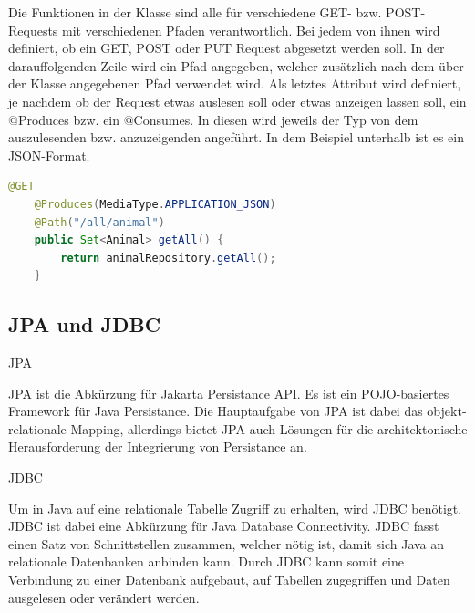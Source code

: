 Die Funktionen in der Klasse sind alle für verschiedene GET- bzw. POST-Requests mit verschiedenen Pfaden verantwortlich. Bei jedem von ihnen wird definiert, ob ein GET, POST oder PUT Request abgesetzt werden soll. In der darauffolgenden Zeile wird ein Pfad angegeben, welcher zusätzlich nach dem über der Klasse angegebenen Pfad verwendet wird. Als letztes Attribut wird definiert, je nachdem ob der Request etwas auslesen soll oder etwas anzeigen lassen soll, ein @Produces bzw. ein @Consumes. In diesen wird jeweils der Typ von dem auszulesenden bzw. anzuzeigenden angeführt. In dem Beispiel unterhalb ist es ein JSON-Format. \cite{quarkusRest}
\begin{lstlisting}[language=java,caption=Quarkus POST-Request,label=lst:impl:canvasJSchartOptions]
    @GET
    @Produces(MediaType.APPLICATION_JSON)
    @Path("/all/animal")
    public Set<Animal> getAll() {
        return animalRepository.getAll();
    }
  \end{lstlisting}


 
\subsection{JPA und JDBC}



\begin{compactitem}
    \item [JPA]
    \item JPA ist die Abkürzung für Jakarta Persistance API. Es ist ein POJO-basiertes Framework für Java Persistance. Die Hauptaufgabe von JPA ist dabei das objekt-relationale Mapping, allerdings bietet JPA auch Lösungen für die architektonische Herausforderung der Integrierung von Persistance an.
    \item [JDBC]
    \item Um in Java auf eine relationale Tabelle Zugriff zu erhalten, wird JDBC benötigt. JDBC ist dabei eine Abkürzung für Java Database Connectivity. JDBC fasst einen Satz von Schnittstellen zusammen, welcher nötig ist, damit sich Java an relationale Datenbanken anbinden kann. Durch JDBC kann somit eine Verbindung zu einer Datenbank aufgebaut, auf Tabellen zugegriffen und Daten ausgelesen oder verändert werden.  
\end{compactitem}
\cite{quarkusHibernate}

